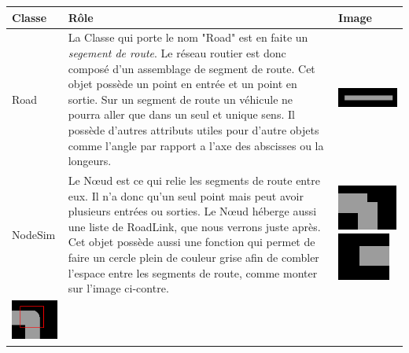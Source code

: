 \documentclass[a4paper,11pt]{article}
\begin{document}
\hspace{-1.5cm}
\begin{tabular}{| M{2cm} | M{7cm} | M{4cm} |}
    \hline
    Classe & Rôle & Image \tabularnewline
    \hline
    \begin{large}Road\end{large} & La Classe qui porte le nom "Road" est en faite un \textit{segement de route}. Le réseau routier est donc composé d'un assemblage de segment de route. Cet objet possède un point en entrée et un point en sortie. Sur un segment de route un véhicule ne pourra aller que dans un seul et unique sens. Il possède d'autres attributs utiles pour d'autre objets comme l'angle par rapport a l'axe des abscisses ou la longeurs. & \includegraphics[scale=0.3]{imgClasse/Road.png} \tabularnewline
    \hline
    \begin{large}NodeSim\end{large} & Le N\oe{}ud est ce qui relie les segments de route entre eux. Il n'a donc qu'un seul point mais peut avoir plusieurs entrées ou sorties. Le N\oe{}ud héberge aussi une liste de RoadLink, que nous verrons juste après. Cet objet possède aussi une fonction qui permet de faire un cercle plein de couleur grise afin de combler l'espace entre les segments de route, comme monter sur l'image ci-contre. & 
    \includegraphics[scale=0.5]{imgClasse/node1.png} \hspace{0.2cm}
    \includegraphics[scale=0.5]{imgClasse/node2.png}\\
\vspace{0.3cm}    \includegraphics[scale=0.5]{imgClasse/node3.png} \hspace{0.2cm}

\end{tabular}
\end{document}

